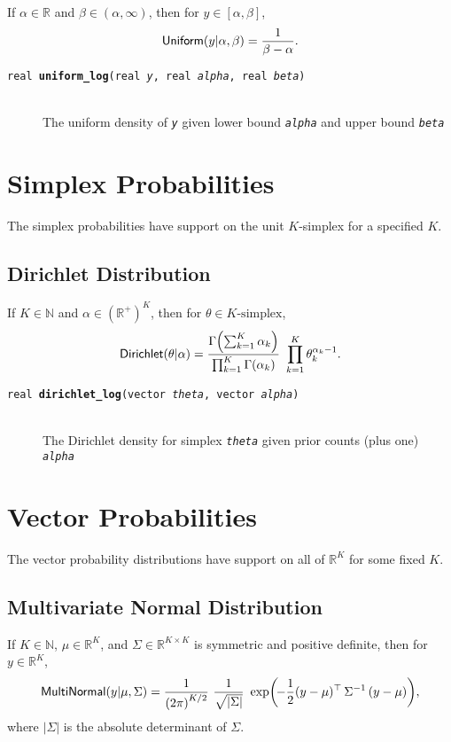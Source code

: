 \documentclass[10pt]{report}
\newcommand{\distro}[1]{\mbox{\sf #1}}
\newcommand{\reals}{\mathbb{R}}
\newcommand{\posreals}{\mathbb{R}^+}
\newcommand{\nats}{\mathbb{N}}
\newcommand{\fitem}[4]{\item[{\tt #1 {\bfseries #2}(#3)}]\mbox{ } \\[4pt] #4}
\newcommand{\farg}[1]{{\tt\slshape #1}}
\begin{document}
If $\alpha \in \reals$ and $\beta \in (\alpha,\infty)$, then for $y
\in [\alpha,\beta]$,
\[
\distro{Uniform}(y|\alpha,\beta)
= 
\frac{1}{\beta - \alpha}
.
\]

\begin{description}
\fitem{real}{uniform\_log}{real \farg{y}, real \farg{alpha}, real
  \farg{beta}}{The uniform density of \farg{y} given lower bound
  \farg{alpha} and upper bound \farg{beta}}
\end{description}

\section{Simplex Probabilities}

The simplex probabilities have support on the unit $K$-simplex for a
specified $K$.

\subsection{Dirichlet Distribution}

If $K \in \nats$ and $\alpha \in (\posreals)^{K}$, then for
$\theta \in \mbox{$K$-simplex}$, 
\[
\distro{Dirichlet}(\theta|\alpha)
= 
\frac{\Gamma \! \left( \sum_{k=1}^K \alpha_k \right)}
     {\prod_{k=1}^K \Gamma(\alpha_k)}
\
\prod_{k=1}^K \theta_k^{\alpha_k - 1}
.
\]

\begin{description}
%
\fitem{real}{dirichlet\_log}{vector \farg{theta}, vector
 \farg{alpha}}{
The Dirichlet density for simplex \farg{theta} given prior counts (plus
one) \farg{alpha}}
%
\end{description}


\section{Vector Probabilities}

The vector probability distributions have support on all of
$\reals^K$ for some fixed $K$.

\subsection{Multivariate Normal Distribution}

If $K \in \nats$, $\mu \in \reals^K$, and $\Sigma \in \reals^{K \times
  K}$ is symmetric and positive definite, then for $y \in \reals^K$,
\[
\distro{MultiNormal}(y|\mu,\Sigma)
=
\frac{1}{\left( 2 \pi \right)^{K/2}}
\
\frac{1}{\sqrt{|\Sigma|}}
\
\exp \! \left( \!
- 
\frac{1}{2}
(y - \mu)^{\top} \, \Sigma^{-1} \, (y - \mu)
\right)
\! ,
\]
%
where $|\Sigma|$ is the absolute determinant of $\Sigma$.
\end{document}
